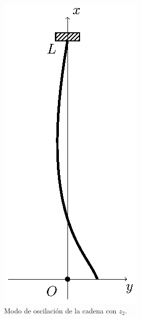 \begin{figure}[H]
    \centering
    \includegraphics[scale=1]{Imagenes/Cadena_Oscilante_04.eps}
    \caption{Modo de oscilación de la cadena con $z_{2}$.}
    \label{fig:figura_modo_z2}
\end{figure}
